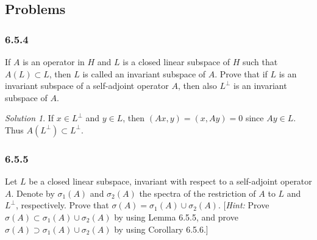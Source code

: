 \documentclass{report}
\theoremstyle{remark}
\newtheorem*{solution}{Solution}
\begin{document}
\subsection*{Problems}

\subsubsection*{6.5.4}
If $A$ is an operator in $H$ and $L$ is a closed linear subspace of $H$ such that $A(L) \subset L$, then $L$ is called an invariant subspace of $A$. Prove that if $L$ is an invariant subspace of a self-adjoint operator $A$, then also $L^\perp$ is an invariant subspace of $A$.

\begin{solution}
  If $x \in L^\perp$ and $y \in L$, then $(Ax, y) = (x, Ay) = 0$ since $Ay \in L$. Thus $A(L^\perp) \subset L^\perp$.
\end{solution}

\subsubsection*{6.5.5}
Let $L$ be a closed linear subspace, invariant with respect to a self-adjoint operator $A$. Denote by $\sigma_1(A)$ and $\sigma_2(A)$ the spectra of the restriction of $A$ to $L$ and $L^\perp$, respectively. Prove that $\sigma(A) = \sigma_1(A) \cup \sigma_2(A)$. [\emph{Hint:} Prove $\sigma(A) \subset \sigma_1(A) \cup \sigma_2(A)$ by using Lemma 6.5.5, and prove $\sigma(A) \supset \sigma_1(A) \cup \sigma_2(A)$ by using Corollary 6.5.6.]
\end{document}
